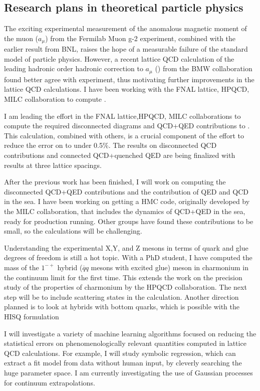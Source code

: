 \subsection{Research plans in theoretical particle physics}

The exciting experimental measurement of the anomalous magnetic
moment of the muon ($a_\mu$) from the Fermilab Muon g-2  experiment,
combined with the
earlier result from BNL, raises the hope of a measurable failure of the
standard model of particle physics.  However, a recent lattice QCD
calculation of the leading hadronic order hadronic correction to
$a_\mu$
(\amu)
from the BMW collaboration found better agree with experiment,
thus motivating further improvements in the lattice QCD
calculations. I have been working with the FNAL lattice, HPQCD, MILC
collaboration to compute \amu.

I am leading the effort in the FNAL lattice,HPQCD,  MILC
collaborations to compute the required disconnected diagrams and
QCD+QED contributions to \amu. This calculation, combined with
others, is a crucial component of the effort to reduce the error on \amu
to under 0.5\%.
The results on disconnected QCD contributions and connected
QCD+quenched QED are being finalized with results at three lattice spacings.

After the previous work has been finished, I will work on
computing the disconnected QCD+QED contributions and the contribution
of QED and QCD in the sea. I have been working on getting a HMC
code, originally developed by the MILC collaboration, that includes
the dynamics of QCD+QED in the sea, ready for production running.
Other groups have found these contributions to be small, so the
calculations will be challenging. 




Understanding the experimental X,Y, and Z mesons in terms of quark and
glue degrees of freedom is still a hot topic. With a PhD student,
I have computed the mass of the $1^{-+}$ hybrid ($\overline{q}q$
mesons with excited glue) meson in charmonium in the continuum limit
for the first time. This extends the work on the precision study of
the properties of charmonium by the HPQCD collaboration.
The next step will be to include scattering states in the calculation.
Another direction planned is to look at hybrids with bottom quarks,
which is possible with the HISQ formulation 

I will investigate a variety of machine learning algorithms
focused on reducing the statistical errors on phenomenologically
relevant quantities computed in lattice QCD calculations. For example,
I will study symbolic regression, which can extract a fit model from
data without human input, by cleverly searching the huge parameter
space. I am currently investigating the use of Gaussian processes
for continuum extrapolations.

